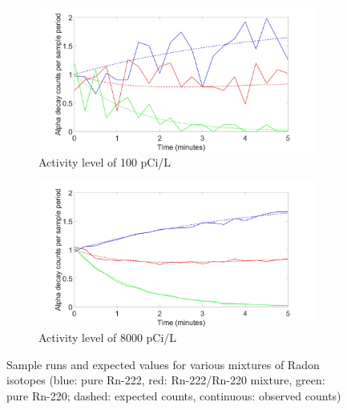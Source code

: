\documentclass[11pt]{m2pi}
\begin{document}
\begin{figure}[h]\ContinuedFloat
	\centering
        \begin{subfigure}[c]{0.475\textwidth}  
            \includegraphics[scale=0.0825]{images/new_100pcpl.jpg}
            \caption[]%
            {{\tiny Activity level of 100 pCi/L}}    
            \label{fig:MediumActivitySample}
        \end{subfigure}
        \begin{subfigure}[c]{0.475\textwidth}   
            \includegraphics[scale=0.0825]{images/new_8000pcpl.jpg}
            \caption[]%
            {{\tiny Activity level of 8000 pCi/L}}    
            \label{fig:HighActivitySample}
        \end{subfigure}
        \caption[ The average and standard deviation of critical parameters ]
        {\tiny Sample runs and expected values for various mixtures of Radon isotopes (blue: pure Rn-222, red: Rn-222/Rn-220 mixture, green: pure Rn-220; dashed: expected counts, continuous: observed counts) } 
        \label{fig: SampleRuns}
\end{figure}

\vspace*{-0.3cm}
\end{document}
